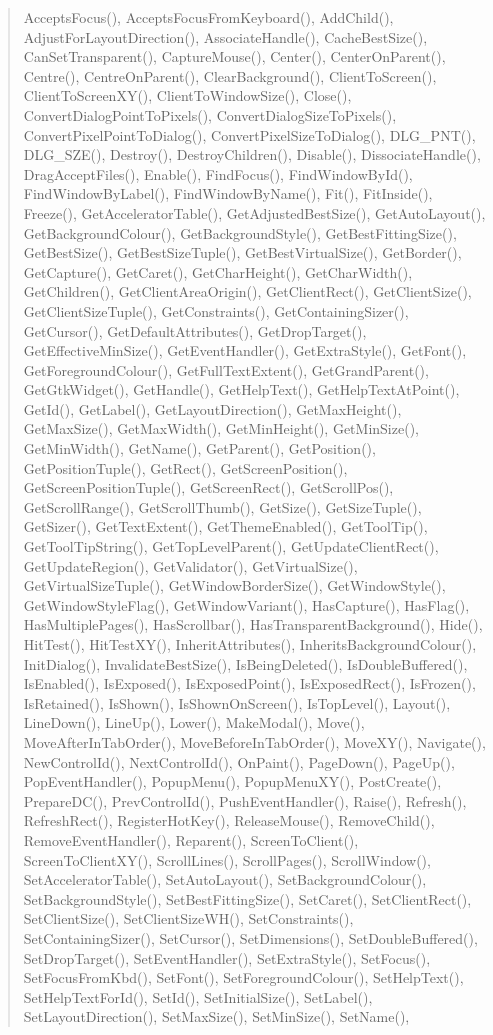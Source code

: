 \begin{quote}
AcceptsFocus(), AcceptsFocusFromKeyboard(), AddChild(), AdjustForLayoutDirection(), AssociateHandle(), CacheBestSize(), CanSetTransparent(), CaptureMouse(), Center(), CenterOnParent(), Centre(), CentreOnParent(), ClearBackground(), ClientToScreen(), ClientToScreenXY(), ClientToWindowSize(), Close(), ConvertDialogPointToPixels(), ConvertDialogSizeToPixels(), ConvertPixelPointToDialog(), ConvertPixelSizeToDialog(), DLG\_PNT(), DLG\_SZE(), Destroy(), DestroyChildren(), Disable(), DissociateHandle(), DragAcceptFiles(), Enable(), FindFocus(), FindWindowById(), FindWindowByLabel(), FindWindowByName(), Fit(), FitInside(), Freeze(), GetAcceleratorTable(), GetAdjustedBestSize(), GetAutoLayout(), GetBackgroundColour(), GetBackgroundStyle(), GetBestFittingSize(), GetBestSize(), GetBestSizeTuple(), GetBestVirtualSize(), GetBorder(), GetCapture(), GetCaret(), GetCharHeight(), GetCharWidth(), GetChildren(), GetClientAreaOrigin(), GetClientRect(), GetClientSize(), GetClientSizeTuple(), GetConstraints(), GetContainingSizer(), GetCursor(), GetDefaultAttributes(), GetDropTarget(), GetEffectiveMinSize(), GetEventHandler(), GetExtraStyle(), GetFont(), GetForegroundColour(), GetFullTextExtent(), GetGrandParent(), GetGtkWidget(), GetHandle(), GetHelpText(), GetHelpTextAtPoint(), GetId(), GetLabel(), GetLayoutDirection(), GetMaxHeight(), GetMaxSize(), GetMaxWidth(), GetMinHeight(), GetMinSize(), GetMinWidth(), GetName(), GetParent(), GetPosition(), GetPositionTuple(), GetRect(), GetScreenPosition(), GetScreenPositionTuple(), GetScreenRect(), GetScrollPos(), GetScrollRange(), GetScrollThumb(), GetSize(), GetSizeTuple(), GetSizer(), GetTextExtent(), GetThemeEnabled(), GetToolTip(), GetToolTipString(), GetTopLevelParent(), GetUpdateClientRect(), GetUpdateRegion(), GetValidator(), GetVirtualSize(), GetVirtualSizeTuple(), GetWindowBorderSize(), GetWindowStyle(), GetWindowStyleFlag(), GetWindowVariant(), HasCapture(), HasFlag(), HasMultiplePages(), HasScrollbar(), HasTransparentBackground(), Hide(), HitTest(), HitTestXY(), InheritAttributes(), InheritsBackgroundColour(), InitDialog(), InvalidateBestSize(), IsBeingDeleted(), IsDoubleBuffered(), IsEnabled(), IsExposed(), IsExposedPoint(), IsExposedRect(), IsFrozen(), IsRetained(), IsShown(), IsShownOnScreen(), IsTopLevel(), Layout(), LineDown(), LineUp(), Lower(), MakeModal(), Move(), MoveAfterInTabOrder(), MoveBeforeInTabOrder(), MoveXY(), Navigate(), NewControlId(), NextControlId(), OnPaint(), PageDown(), PageUp(), PopEventHandler(), PopupMenu(), PopupMenuXY(), PostCreate(), PrepareDC(), PrevControlId(), PushEventHandler(), Raise(), Refresh(), RefreshRect(), RegisterHotKey(), ReleaseMouse(), RemoveChild(), RemoveEventHandler(), Reparent(), ScreenToClient(), ScreenToClientXY(), ScrollLines(), ScrollPages(), ScrollWindow(), SetAcceleratorTable(), SetAutoLayout(), SetBackgroundColour(), SetBackgroundStyle(), SetBestFittingSize(), SetCaret(), SetClientRect(), SetClientSize(), SetClientSizeWH(), SetConstraints(), SetContainingSizer(), SetCursor(), SetDimensions(), SetDoubleBuffered(), SetDropTarget(), SetEventHandler(), SetExtraStyle(), SetFocus(), SetFocusFromKbd(), SetFont(), SetForegroundColour(), SetHelpText(), SetHelpTextForId(), SetId(), SetInitialSize(), SetLabel(), SetLayoutDirection(), SetMaxSize(), SetMinSize(), SetName(), 
\end{quote}
